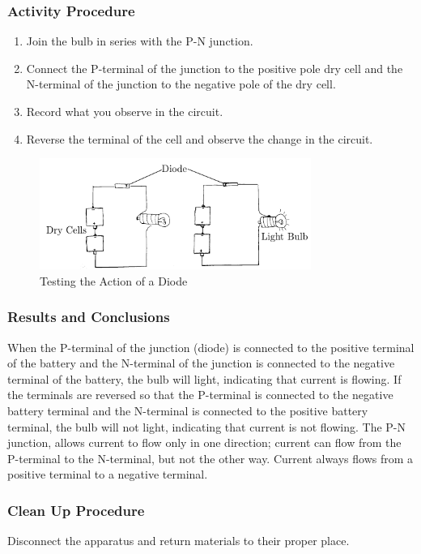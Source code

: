 \subsubsection*{Activity Procedure}
\begin{enumerate}
\item{Join the bulb in series with the P-N junction.} 
\item{Connect the P-terminal of the junction to the positive pole dry cell and the N-terminal of the junction to the negative pole of the dry cell.} 
\item{Record what you observe in the circuit.} 
\item{Reverse the terminal of the cell and observe the change in the circuit.} 
\end{enumerate}

\begin{figure}
\begin{center}
\includegraphics{./img/diode.png}
\caption{Testing the Action of a Diode}
\label{fig:diode}
\end{center}
\end{figure}

\subsubsection*{Results and Conclusions}
When the P-terminal of the junction (diode) is connected to the positive terminal of the battery and the N-terminal of the junction is connected to the negative terminal of the battery, the bulb will light, indicating that current is flowing.  
If the terminals are reversed so that the P-terminal is connected to the negative battery terminal and the N-terminal is connected to the positive battery terminal, the bulb will not light, indicating that current is not flowing.  
The P-N junction, allows current to flow only in one direction; current can flow from the P-terminal to the N-terminal, but not the other way.  
Current always flows from a positive terminal to a negative terminal.  

\subsubsection*{Clean Up Procedure}
Disconnect the apparatus and return materials to their proper place.


